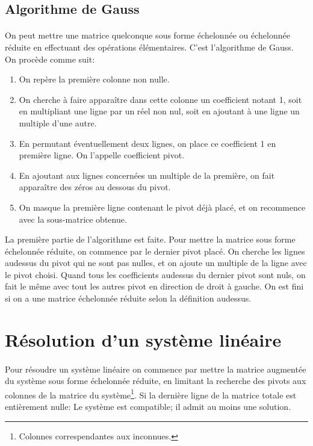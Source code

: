 %
\subsection{Algorithme de Gauss}
%
\paragraph{} On peut mettre une matrice quelconque sous forme échelonnée ou échelonnée réduite en effectuant des opérations élémentaires. C'est l'algorithme de Gauss. \\
On procède comme suit:
\begin{enumerate}
  \item On repère la première colonne non nulle.
  \item On cherche à faire apparaître dans cette colonne un coefficient notant 1, soit en multipliant une ligne par un réel non nul, soit en ajoutant à une ligne un multiple d'une autre.
  \item En permutant éventuellement deux lignes, on place ce coefficient 1 en première ligne. On l'appelle coefficient pivot.
  \item En ajoutant aux lignes concernées un multiple de la première, on fait apparaître des zéros au dessous du pivot. 
  \item On masque la première ligne contenant le pivot déjà placé, et on recommence avec la sous-matrice obtenue.
\end{enumerate}
La première partie de l'algorithme est faite. Pour mettre la matrice sous forme échelonnée réduite, on commence par le dernier pivot placé. On cherche les lignes audessus du pivot qui ne sont pas nulles, et on ajoute un multiple de la ligne avec le pivot choisi. Quand tous les coefficients audessus du dernier pivot sont nuls, on fait le même avec tout les autres pivot en direction de droit à gauche. On est fini si on a une matrice échelonnée réduite selon la définition audessus.

%
\section{Résolution d'un système linéaire}
%
%
\paragraph{} Pour résoudre un système linéaire on commence par mettre la matrice augmentée du système sous forme échelonnée réduite, en limitant la recherche des pivots aux colonnes de la matrice du système\footnote{Colonnes correspendantes aux inconnues.}.
Si la dernière ligne de la matrice totale est entièrement nulle: Le système est compatible; il admit au moins une solution.
